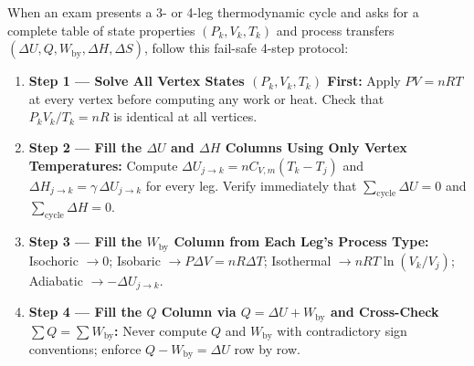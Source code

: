 When an exam presents a 3- or 4-leg thermodynamic cycle and asks for a complete table of state properties $(P_k, V_k, T_k)$ and process transfers $(\Delta U, Q, W_{\mathrm{by}}, \Delta H, \Delta S)$, follow this fail-safe 4-step protocol:
\begin{enumerate}
  \item \textbf{Step 1 — Solve All Vertex States $(P_k, V_k, T_k)$ First:} Apply $PV = nRT$ at every vertex before computing any work or heat. Check that $P_k V_k / T_k = nR$ is identical at all vertices.
  \item \textbf{Step 2 — Fill the $\Delta U$ and $\Delta H$ Columns Using Only Vertex Temperatures:} Compute $\Delta U_{j\to k} = nC_{V,m}(T_k - T_j)$ and $\Delta H_{j\to k} = \gamma\,\Delta U_{j\to k}$ for every leg. Verify immediately that $\sum_{\mathrm{cycle}} \Delta U = 0$ and $\sum_{\mathrm{cycle}} \Delta H = 0$.
  \item \textbf{Step 3 — Fill the $W_{\mathrm{by}}$ Column from Each Leg's Process Type:} Isochoric $\to 0$; Isobaric $\to P\Delta V = nR\Delta T$; Isothermal $\to nRT\ln(V_k/V_j)$; Adiabatic $\to -\Delta U_{j\to k}$.
  \item \textbf{Step 4 — Fill the $Q$ Column via $Q = \Delta U + W_{\mathrm{by}}$ and Cross-Check $\sum Q = \sum W_{\mathrm{by}}$:} Never compute $Q$ and $W_{\mathrm{by}}$ with contradictory sign conventions; enforce $Q - W_{\mathrm{by}} = \Delta U$ row by row.
\end{enumerate}

